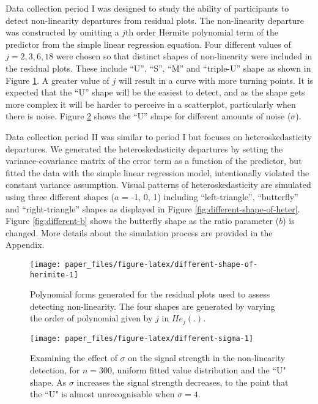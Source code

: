 \documentclass[]{interact}
\theoremstyle{plain}%
\theoremstyle{definition}
\theoremstyle{remark}
\begin{document}
Data collection period I was designed to study the ability of
participants to detect non-linearity departures from residual plots. The
non-linearity departure was constructed by omitting a \(j\)th order
Hermite polynomial
\citetext{\citealp{hermite1864nouveau}; \citealp[originally
by][]{de1820theorie}} term of the predictor from the simple linear
regression equation. Four different values of \(j = 2, 3, 6, 18\) were
chosen so that distinct shapes of non-linearity were included in the
residual plots. These include ``U'', ``S'', ``M'' and ``triple-U'' shape
as shown in Figure \ref{fig:different-shape-of-herimite}. A greater
value of \(j\) will result in a curve with more turning points. It is
expected that the ``U'' shape will be the easiest to detect, and as the
shape gets more complex it will be harder to perceive in a scatterplot,
particularly when there is noise. Figure \ref{fig:different-sigma} shows
the ``U'' shape for different amounts of noise (\(\sigma\)).

Data collection period II was similar to period I but focuses on
heteroskedasticity departures. We generated the heteroskedasticity
departures by setting the variance-covariance matrix of the error term
as a function of the predictor, but fitted the data with the simple
linear regression model, intentionally violated the constant variance
assumption. Visual patterns of heteroskedasticity are simulated using
three different shapes (\(a\) = -1, 0, 1) including ``left-triangle'',
``butterfly'' and ``right-triangle'' shapes as displayed in Figure
\ref{fig:different-shape-of-heter}. Figure \ref{fig:different-b} shows
the butterfly shape as the ratio parameter (\(b\)) is changed. More
details about the simulation process are provided in the Appendix.

\begin{figure}[!h]

{\centering \texttt{[image: paper\_files/figure-latex/different-shape-of-herimite-1]} 

}

\caption{Polynomial forms generated for the residual plots used to assess detecting non-linearity. The four shapes are generated by varying the order of polynomial given by $j$ in $He_j(.)$.}\label{fig:different-shape-of-herimite}
\end{figure}

\begin{figure}[!h]

{\centering \texttt{[image: paper\_files/figure-latex/different-sigma-1]} 

}

\caption{Examining the effect of $\sigma$ on the signal strength in the non-linearity detection, for $n=300$, uniform fitted value distribution and the ``U" shape. As $\sigma$ increases the signal strength decreases, to the point that the ``U" is almost unrecognisable when $\sigma=4$.}\label{fig:different-sigma}
\end{figure}
\end{document}
